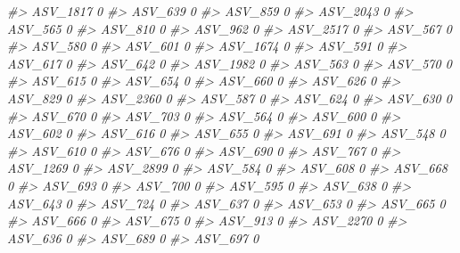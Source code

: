 \documentclass[
]{article}
\newenvironment{Shaded}{\begin{snugshade}}{\end{snugshade}}
\newcommand{\CommentTok}[1]{\textcolor[rgb]{0.56,0.35,0.01}{\textit{#1}}}
\begin{document}
\begin{Shaded}
\begin{Highlighting}[]
\CommentTok{\#\textgreater{} ASV\_1817  0}
\CommentTok{\#\textgreater{} ASV\_639   0}
\CommentTok{\#\textgreater{} ASV\_859   0}
\CommentTok{\#\textgreater{} ASV\_2043  0}
\CommentTok{\#\textgreater{} ASV\_565   0}
\CommentTok{\#\textgreater{} ASV\_810   0}
\CommentTok{\#\textgreater{} ASV\_962   0}
\CommentTok{\#\textgreater{} ASV\_2517  0}
\CommentTok{\#\textgreater{} ASV\_567   0}
\CommentTok{\#\textgreater{} ASV\_580   0}
\CommentTok{\#\textgreater{} ASV\_601   0}
\CommentTok{\#\textgreater{} ASV\_1674  0}
\CommentTok{\#\textgreater{} ASV\_591   0}
\CommentTok{\#\textgreater{} ASV\_617   0}
\CommentTok{\#\textgreater{} ASV\_642   0}
\CommentTok{\#\textgreater{} ASV\_1982  0}
\CommentTok{\#\textgreater{} ASV\_563   0}
\CommentTok{\#\textgreater{} ASV\_570   0}
\CommentTok{\#\textgreater{} ASV\_615   0}
\CommentTok{\#\textgreater{} ASV\_654   0}
\CommentTok{\#\textgreater{} ASV\_660   0}
\CommentTok{\#\textgreater{} ASV\_626   0}
\CommentTok{\#\textgreater{} ASV\_829   0}
\CommentTok{\#\textgreater{} ASV\_2360  0}
\CommentTok{\#\textgreater{} ASV\_587   0}
\CommentTok{\#\textgreater{} ASV\_624   0}
\CommentTok{\#\textgreater{} ASV\_630   0}
\CommentTok{\#\textgreater{} ASV\_670   0}
\CommentTok{\#\textgreater{} ASV\_703   0}
\CommentTok{\#\textgreater{} ASV\_564   0}
\CommentTok{\#\textgreater{} ASV\_600   0}
\CommentTok{\#\textgreater{} ASV\_602   0}
\CommentTok{\#\textgreater{} ASV\_616   0}
\CommentTok{\#\textgreater{} ASV\_655   0}
\CommentTok{\#\textgreater{} ASV\_691   0}
\CommentTok{\#\textgreater{} ASV\_548   0}
\CommentTok{\#\textgreater{} ASV\_610   0}
\CommentTok{\#\textgreater{} ASV\_676   0}
\CommentTok{\#\textgreater{} ASV\_690   0}
\CommentTok{\#\textgreater{} ASV\_767   0}
\CommentTok{\#\textgreater{} ASV\_1269  0}
\CommentTok{\#\textgreater{} ASV\_2899  0}
\CommentTok{\#\textgreater{} ASV\_584   0}
\CommentTok{\#\textgreater{} ASV\_608   0}
\CommentTok{\#\textgreater{} ASV\_668   0}
\CommentTok{\#\textgreater{} ASV\_693   0}
\CommentTok{\#\textgreater{} ASV\_700   0}
\CommentTok{\#\textgreater{} ASV\_595   0}
\CommentTok{\#\textgreater{} ASV\_638   0}
\CommentTok{\#\textgreater{} ASV\_643   0}
\CommentTok{\#\textgreater{} ASV\_724   0}
\CommentTok{\#\textgreater{} ASV\_637   0}
\CommentTok{\#\textgreater{} ASV\_653   0}
\CommentTok{\#\textgreater{} ASV\_665   0}
\CommentTok{\#\textgreater{} ASV\_666   0}
\CommentTok{\#\textgreater{} ASV\_675   0}
\CommentTok{\#\textgreater{} ASV\_913   0}
\CommentTok{\#\textgreater{} ASV\_2270  0}
\CommentTok{\#\textgreater{} ASV\_636   0}
\CommentTok{\#\textgreater{} ASV\_689   0}
\CommentTok{\#\textgreater{} ASV\_697   0}

\end{Highlighting}
\end{Shaded}
\end{document}
